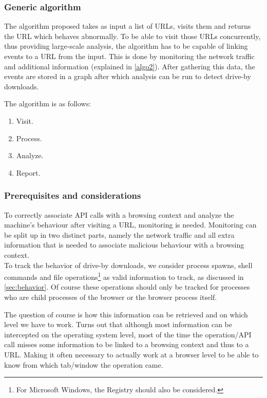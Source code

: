 
\subsubsection{Generic algorithm}

The algorithm proposed takes as input a list of URLs, visits them and returns the URL which behaves abnormally. To be able to visit those URLs concurrently, thus providing large-scale analysis, the algorithm has to be capable of linking events to a URL from the input. This is done by monitoring the network traffic and additional information (explained in \ref{algo2}). After gathering this data, the events are stored in a graph after which analysis can be run to detect drive-by downloads.

The algorithm is as follows:

\begin{enumerate}
\item Visit.
\item Process.
\item Analyze.
\item Report.
\end{enumerate}

\subsubsection{Prerequisites and considerations}

To correctly associate API calls with a browsing context and analyze the machine's behaviour after visiting a URL, monitoring is needed. Monitoring can be split up in two distinct parts, namely the network traffic and all extra information that is needed to associate malicious behaviour with a browsing context.\\

To track the behavior of drive-by downloads, we consider process spawns, shell commands and file operations\footnote{For Microsoft Windows, the Registry should also be considered.} as valid information to track, as discussed in \ref{sec:behavior}. Of course these operations should only be tracked for processes who are child processes of the browser or the browser process itself.\\

The question of course is how this information can be retrieved and on which level we have to work. Turns out that although most information can be intercepted on the operating system level, most of the time the operation/API call misses some information to be linked to a browsing context and thus to a URL. Making it often necessary to actually work at a browser level to be able to know from which tab/window the operation came.\\%

